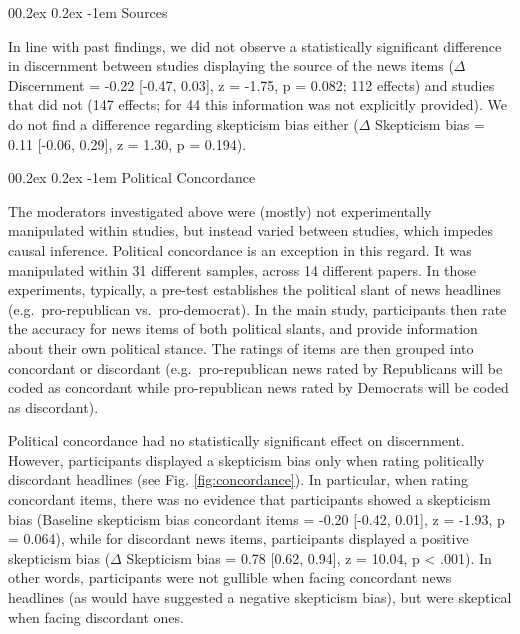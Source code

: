 \documentclass[
  man]{apa6}
\makeatletter
\let\oldparagraph\paragraph
\renewcommand{\paragraph}{
    \@ifstar
      \xxxParagraphStar
      \xxxParagraphNoStar
  }
\newcommand{\xxxParagraphStar}[1]{\oldparagraph*{#1}\mbox{}}
\newcommand{\xxxParagraphNoStar}[1]{\oldparagraph{#1}\mbox{}}
\renewcommand{\paragraph}{\@startsection{paragraph}{4}{\parindent}%
  {0\baselineskip \@plus 0.2ex \@minus 0.2ex}%
  {-1em}%
  {\normalfont\normalsize\bfseries\itshape\typesectitle}}
\makeatother
\begin{document}
\paragraph{Sources}\label{sources}

In line with past findings, we did not observe a statistically significant difference in discernment between studies displaying the source of the news items (\(\Delta\) Discernment = -0.22 {[}-0.47, 0.03{]}, z = -1.75, p = 0.082; 112 effects) and studies that did not (147 effects; for 44 this information was not explicitly provided). We do not find a difference regarding skepticism bias either (\(\Delta\) Skepticism bias = 0.11 {[}-0.06, 0.29{]}, z = 1.30, p = 0.194).

\paragraph{Political Concordance}\label{political-concordance}

The moderators investigated above were (mostly) not experimentally manipulated within studies, but instead varied between studies, which impedes causal inference. Political concordance is an exception in this regard. It was manipulated within 31 different samples, across 14 different papers. In those experiments, typically, a pre-test establishes the political slant of news headlines (e.g.~pro-republican vs.~pro-democrat). In the main study, participants then rate the accuracy for news items of both political slants, and provide information about their own political stance. The ratings of items are then grouped into concordant or discordant (e.g.~pro-republican news rated by Republicans will be coded as concordant while pro-republican news rated by Democrats will be coded as discordant).

Political concordance had no statistically significant effect on discernment. However, participants displayed a skepticism bias only when rating politically discordant headlines (see Fig. \ref{fig:concordance}). In particular, when rating concordant items, there was no evidence that participants showed a skepticism bias (Baseline skepticism bias concordant items = -0.20 {[}-0.42, 0.01{]}, z = -1.93, p = 0.064), while for discordant news items, participants displayed a positive skepticism bias (\(\Delta\) Skepticism bias = 0.78 {[}0.62, 0.94{]}, z = 10.04, p \textless{} .001). In other words, participants were not gullible when facing concordant news headlines (as would have suggested a negative skepticism bias), but were skeptical when facing discordant ones.
\end{document}
